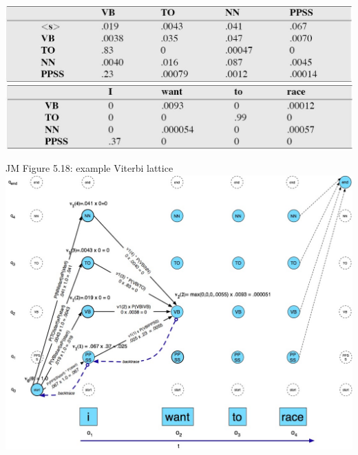 \documentclass[9pt,xcolor=pdftex,dvipsnames,table]{beamer}
\begin{document}
\begin{frame}

	\includegraphics[width=.9\paperwidth]{hmmt1}\\
	\vspace{.5cm}
	\includegraphics[width=.9\paperwidth]{hmmt2}	
\end{frame}

\begin{frame}{JM Figure 5.18: example Viterbi lattice}
	\includegraphics[width=.75\paperwidth]{pos5-18}
\end{frame}
\end{document}
